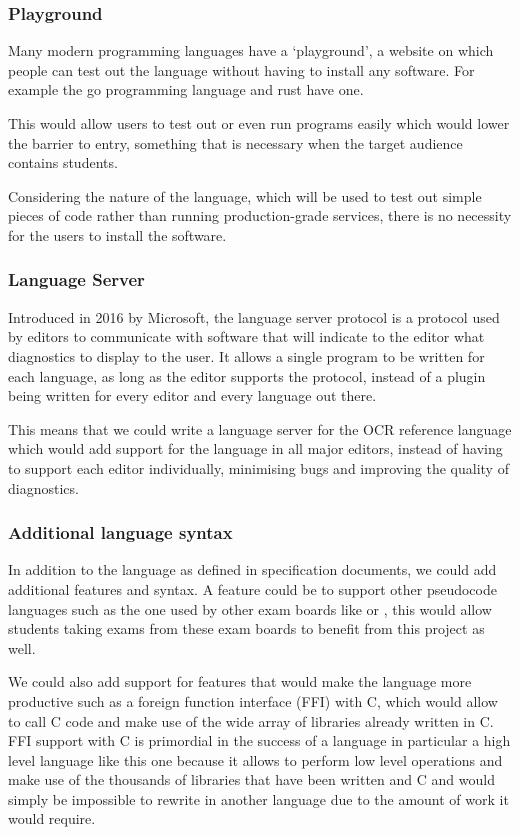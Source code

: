 \documentclass{article}
\begin{document}
\subsubsection{Playground}

Many modern programming languages have a `playground', a website on which
people can test out the language without having to install any software. For
example the go programming language and rust have one\cite{rustPlayground,
goPlayground}.

This would allow users to test out or even run programs easily which would
lower the barrier to entry, something that is necessary when the target
audience contains students.

Considering the nature of the language, which will be used to test out simple
pieces of code rather than running production-grade services, there is no
necessity for the users to install the software.

\subsubsection{Language Server}

Introduced in 2016 by Microsoft, the language server protocol is a protocol
used by editors to communicate with software that will indicate to the editor
what diagnostics to display to the user. It allows a single program to be
written for each language, as long as the editor supports the protocol, instead
of a plugin being written for every editor and every language out there.

This means that we could write a language server for the OCR reference language
which would add support for the language in all major editors, instead of
having to support each editor individually, minimising bugs and improving the
quality of diagnostics.

\subsubsection{Additional language syntax}

In addition to the language as defined in specification documents, we could add
additional features and syntax. A feature could be to support other pseudocode
languages such as the one used by other exam boards like \textcite{aqaCS} or
\textcite{wjecCS}, this would allow students taking exams from these exam
boards to benefit from this project as well.

We could also add support for features that would make the language more
productive such as a foreign function interface (FFI) with C, which would allow
to call C code and make use of the wide array of libraries already written in
C. FFI support with C is primordial in the success of a language in particular
a high level language like this one because it allows to perform low level
operations and make use of the thousands of libraries that have been written
and C and would simply be impossible to rewrite in another language due to the
amount of work it would require.
\end{document}
